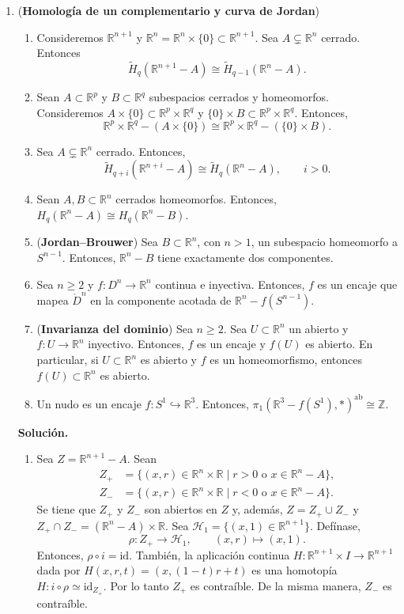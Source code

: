 \documentclass[11pt,a4paper]{article}
\theoremstyle{plain}
\theoremstyle{definition}
\theoremstyle{remark}
\newcommand{\RR}{\mathbb R}
\newcommand{\ZZ}{\mathbb Z}
\begin{document}
\begin{enumerate}[label=\arabic*.,leftmargin=*]
\item (\textbf{Homología de un complementario y curva de Jordan})
\begin{enumerate}[label=\alph*)]
\item Consideremos $\RR^{n+1}$ y $\RR^n=\RR^n\times\{0\}\subset\RR^{n+1}$.
Sea $A\subsetneq\RR^n$ cerrado. Entonces
\[
\tilde H_q(\RR^{n+1}-A)\cong\tilde H_{q-1}(\RR^n-A).
\]
\item Sean $A\subset\RR^p$ y $B\subset\RR^q$ subespacios cerrados y
homeomorfos. Consideremos $A\times\{0\}\subset\RR^p\times\RR^q$ y
$\{0\}\times B\subset\RR^p\times\RR^q$. Entonces,
\[
\RR^p\times\RR^q-(A\times\{0\})\cong\RR^p\times\RR^q-(\{0\}\times B).
\]
\item Sea $A\subsetneq\RR^n$ cerrado. Entonces,
\[
\tilde H_{q+i}(\RR^{n+i}-A)\cong\tilde H_q(\RR^n-A), \qquad i>0.
\]
\item Sean $A,B\subset\RR^n$ cerrados homeomorfos. Entonces,
$H_q(\RR^n-A)\cong H_q(\RR^n-B)$.
\item (\textbf{Jordan--Brouwer}) Sea $B\subset\RR^n$, con $n>1$, un
subespacio homeomorfo a $S^{n-1}$. Entonces, $\RR^n-B$ tiene exactamente
dos componentes.
\item Sea $n\ge2$ y $f:D^n\to\RR^n$ continua e inyectiva. Entonces, $f$ es
un encaje que mapea $\mathring D^n$ en la componente acotada de
$\RR^n-f(S^{n-1})$.
\item (\textbf{Invarianza del dominio}) Sea $n\ge2$. Sea $U\subset\RR^n$ un
abierto y $f:U\to\RR^n$ inyectivo. Entonces, $f$ es un encaje y $f(U)$ es
abierto. En particular, si $U\subset\RR^n$ es abierto y $f$ es un
homeomorfismo, entonces $f(U)\subset\RR^n$ es abierto.
\item Un nudo es un encaje $f:S^1\hookrightarrow\RR^3$. Entonces,
$\pi_1(\RR^3-f(S^1),*)^{\mathrm{ab}}\cong\ZZ$.
\end{enumerate}

\noindent\textbf{Solución.}
\begin{enumerate}[label=\alph*)]
\item Sea $Z=\RR^{n+1}-A$. Sean
\[
\begin{aligned}
Z_+&=\{(x,r)\in\RR^n\times\RR\mid r>0\text{ o }x\in\RR^n-A\},\\
Z_-&=\{(x,r)\in\RR^n\times\RR\mid r<0\text{ o }x\in\RR^n-A\}.
\end{aligned}
\]
Se tiene que $Z_+$ y $Z_-$ son abiertos en $Z$ y, además, $Z=Z_+\cup Z_-$ y
$Z_+\cap Z_-=(\RR^n-A)\times\RR$. Sea $\mathcal H_1=\{(x,1)\in\RR^{n+1}\}$.
Defínase,
\[
\rho:Z_+\to\mathcal H_1, \qquad (x,r)\mapsto(x,1).
\]
Entonces, $\rho\circ i=\mathrm{id}$. También, la aplicación continua
$H:\RR^{n+1}\times I\to\RR^{n+1}$ dada por $H(x,r,t)=(x,(1-t)r+t)$ es una
homotopía $H:i\circ\rho\simeq\mathrm{id}_{Z_+}$. Por lo tanto $Z_+$ es
contraíble. De la misma manera, $Z_-$ es contraíble.


\end{enumerate}
\end{enumerate}
\end{document}
